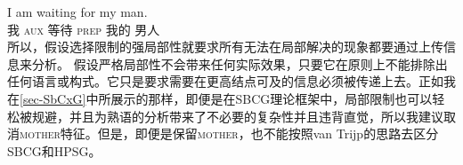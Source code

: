 \ea
\gll I am waiting for my man.\\
    我 \textsc{aux} 等待 \textsc{prep} 我的 男人\\
\z 
所以，假设选择限制的强局部性就要求所有无法在局部解决的现象都要通过上传信息来分析。
假设严格局部性不会带来任何实际效果，只要它在原则上不能排除出任何语言或构式。它只是要求需要在更高结点可及的信息必须被传递上去。正如我在\ref{sec-SbCxG}中所展示的那样，即便是在SBCG理论框架中，局部限制也可以轻松被规避，并且为熟语的分析带来了不必要的复杂性并且违背直觉，所以我建议取消\textsc{mother}特征。但是，即便是保留\textsc{mother}，也不能按照van Trijp的思路去区分SBCG和HPSG。

